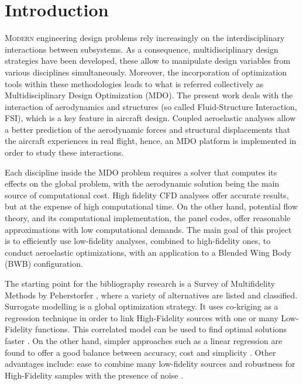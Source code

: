 \documentclass[conf]{new-aiaa}
\begin{document}
\section{Introduction}
\lettrine{M}{odern} engineering design problems rely increasingly on the interdisciplinary interactions between subsystems. As a consequence, multidisciplinary design strategies have been developed, these allow to manipulate design variables from various disciplines simultaneously. Moreover, the incorporation of optimization tools within these methodologies leads to what is referred collectively as Multidisciplinary Design Optimization (MDO).    
The present work deals with the interaction of aerodynamics and structures (so called Fluid-Structure Interaction, FSI), which is a key feature in aircraft design. Coupled aeroelastic analyses allow a better prediction of the aerodynamic forces and structural displacements that the aircraft experiences in real flight, hence, an MDO platform is implemented in order to study these interactions. \par 
Each discipline inside the MDO problem requires a solver that computes its effects on the global problem, with the aerodynamic solution being the main source of computational cost. High fidelity CFD analyses offer accurate results, but at the expense of high computational time. On the other hand, potential flow theory, and its computational implementation, the panel codes, offer reasonable approximations with low computational demands. The main goal of this project is to efficiently use low-fidelity analyses, combined to high-fidelity ones, to conduct aeroelastic optimizations, with an application to a Blended Wing Body (BWB) configuration. \par
The starting point for the bibliography research is a Survey of Multifidelity Methods by Peherstorfer \cite{peherstorfer2018survey}, where a variety of alternatives are listed and classified. Surrogate modelling is a global optimization strategy. It uses co-kriging as a regression technique in order to link High-Fidelity sources with one or many Low-Fidelity functions. This correlated model can be used to find optimal solutions faster \cite{Forrester2007}. On the other hand, simpler approaches such as a linear regression are found to offer a good balance between accuracy, cost and simplicity \cite{Zhang2019}. Other advantages include: ease to combine many low-fidelity sources and robustness for High-Fidelity samples with the presence of noise \cite{Zhang2019}. \par 
\end{document}
